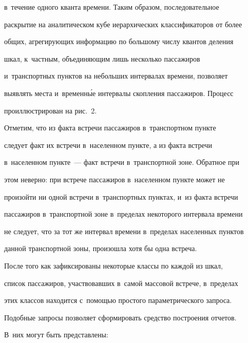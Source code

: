 в~течение одного кванта времени. Таким образом, последовательное 


раскрытие на аналитическом кубе иерархических классификаторов от более 


общих, агрегирующих информацию по большому числу квантов деления 


шкал, к~частным, объединяющим лишь несколько пассажиров 


и~транспортных пунктов на небольших интервалах времени, позволяет 


выявлять места и~временн\'{ы}е интервалы скопления пассажиров. Процесс 


проиллюстрирован на рис.~2.











      Отметим, что из факта встречи пассажиров в~транспортном пункте 


следует факт их встречи в~населенном пункте, а из факта встречи 


в~населенном пункте~--- факт встречи в~транспортной зоне. Обратное при 


этом неверно: при встрече пассажиров в~населенном пункте может не 


произойти ни одной встречи в~транспортных пунктах, и~из факта встречи 


пассажиров в~транспортной зоне в~пределах некоторого интервала времени 


не следует, что за тот же интервал времени в~пределах населенных пунктов 


данной транспортной зоны, произошла хотя бы одна встреча.


      


      После того как зафиксированы некоторые классы по каждой из шкал, 


список пассажиров, участвовавших в~самой массовой встрече, в~пределах 


этих классов находится с~помощью простого параметрического запроса. 


Подобные запросы позволяет сформировать средство построения отчетов. 


В~них могут быть представлены:


